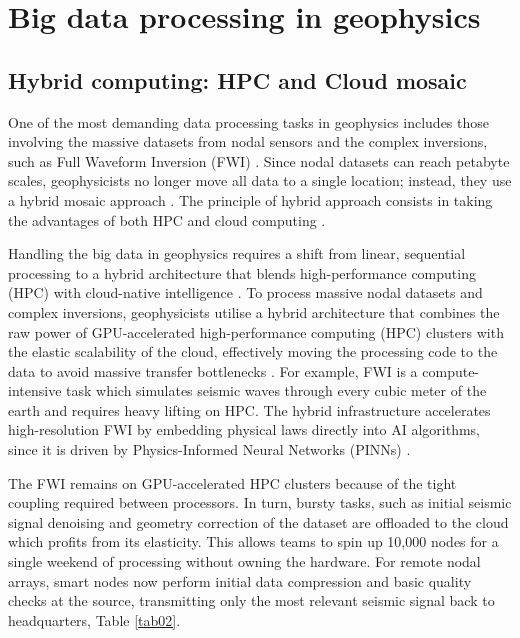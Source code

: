 \documentclass[data,article,submit,pdftex,moreauthors]{Definitions/mdpi}
\begin{document}
\section{Big data processing in geophysics}

\subsection{Hybrid computing: HPC and Cloud mosaic}
One of the most demanding data processing tasks in geophysics includes those involving the massive datasets from nodal sensors and the complex inversions, such as Full Waveform Inversion (FWI) \cite{virieux2009overview, witte2019scalable}. Since nodal datasets can reach petabyte scales, geophysicists no longer move all data to a single location; instead, they use a hybrid mosaic approach \cite{peter2011forward, wang2020cloud}. The principle of hybrid approach consists in taking the advantages of both HPC and cloud computing \cite{fox2017big, assuncao2015big}.

Handling the big data in geophysics requires a shift from linear, sequential processing to a hybrid architecture that blends high-performance computing (HPC) with cloud-native intelligence \cite{fox2017big, hashem2015rise}. To process massive nodal datasets and complex inversions, geophysicists utilise a hybrid architecture that combines the raw power of GPU-accelerated high-performance computing (HPC) clusters with the elastic scalability of the cloud, effectively moving the processing code to the data to avoid massive transfer bottlenecks \cite{wang2020cloud}. For example, FWI is a compute-intensive task which simulates seismic waves through every cubic meter of the earth and requires heavy lifting on HPC. The hybrid infrastructure accelerates high-resolution FWI by embedding physical laws directly into AI algorithms, since it is driven by Physics-Informed Neural Networks (PINNs) \cite{raissi2019physics, sun2020surrogate}.

The FWI remains on GPU-accelerated HPC clusters because of the tight coupling required between processors. In turn, bursty tasks, such as initial seismic signal denoising and geometry correction of the dataset are offloaded to the cloud which profits from its elasticity. This allows teams to spin up 10,000 nodes for a single weekend of processing without owning the hardware. For remote nodal arrays, smart nodes now perform initial data compression and basic quality checks at the source, transmitting only the most relevant seismic signal back to headquarters, Table \ref{tab02}. 
\end{document}
